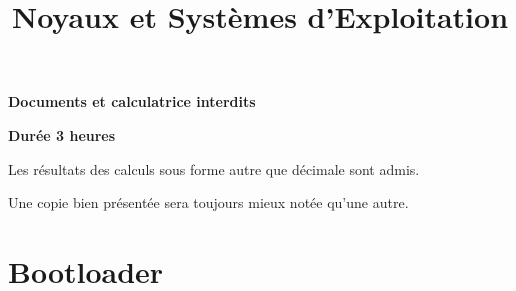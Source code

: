 %
%
%
%
%

%
%

%
%

\def\path{../../..}

%
%



%
%

\title{Noyaux et Syst\`emes d'Exploitation}

%
%

\rhead{}

%
%
\usepackage[utf8]{inputenc}
\usepackage{enumitem}


%
%

\maketitle

%
%

\indentation{}

%
%

\begin{center}

\textbf{Documents et calculatrice interdits}

\textbf{Durée 3 heures}

\scriptsize{Les résultats des calculs sous forme autre que décimale sont admis.}

\scriptsize{Une copie bien présentée sera toujours mieux notée qu'une autre.}

\end{center}

%
%

%
%

\section{{Bootloader}
         {\hfill{} }}

